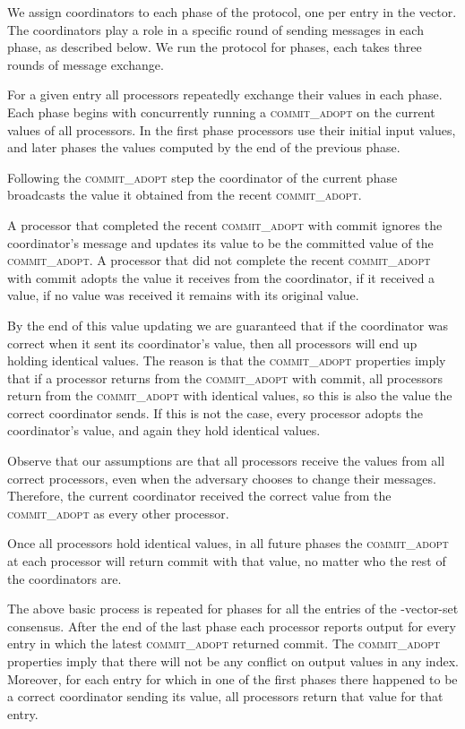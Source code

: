 \documentclass[11pt]{article}
\newcommand{\ca}{{\small\textsc{commit\!\_adopt}}\xspace}
\begin{document}
We assign  coordinators to each phase of the protocol, one per entry in the vector.  The coordinators play a role in a specific round of sending messages in each phase, as described below.  We run the protocol for  phases, each takes three rounds of message exchange. 

For a given entry all processors repeatedly exchange their values in each phase.  Each phase begins with concurrently running a \ca on the current values of all processors.  In the first phase processors use their initial input values, and later phases the values  computed by the end of the previous phase. 

Following the \ca step the coordinator of the current phase broadcasts the value it obtained from the recent \ca.  

A processor that completed the recent \ca with {\sc commit} ignores the coordinator's message and updates its value to be the committed value of the \ca.
A processor that did not complete the recent \ca with {\sc commit} adopts the value it receives from the coordinator, if it received a value, if no value was received it remains with its original value.

By the end of this value updating we are guaranteed that if the coordinator was correct when it sent its coordinator's value, then all processors will end up holding identical values.  
The reason is 
that the \ca properties imply that if a processor returns from the \ca with {\sc commit}, all processors  return from the \ca with identical values, so this is also the value the correct coordinator sends.  
If this is not the case, every processor adopts the coordinator's value, and again they hold identical values.

Observe that our assumptions are that all processors receive the values from all correct processors, even when the adversary chooses to change their messages. Therefore, the current coordinator received the correct value from the \ca as every other processor.

Once all processors hold identical values, in all future phases the \ca at each processor will return {\sc commit} with that value, no matter who the rest of the coordinators are.

The above basic process is repeated for  phases for all the  entries of the -vector-set consensus.
After the end of the last phase each processor reports output for every entry in which the latest \ca returned  {\sc commit}. 
The \ca properties imply that there will not be any conflict on output values in any index. 
Moreover, for each entry for which in one of the first  phases there happened to be a correct coordinator sending its value,  all processors return that value for that entry.
\end{document}
